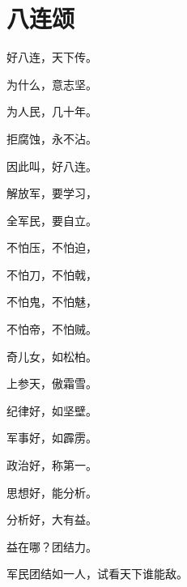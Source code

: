 \section[八连颂（一九六三年八月一日）]{八连颂}



好八连，天下传。

为什么，意志坚。

为人民，几十年。

拒腐蚀，永不沾。

因此叫，好八连。

解放军，要学习，

全军民，要自立。

不怕压，不怕迫，

不怕刀，不怕戟，

不怕鬼，不怕魅，

不怕帝，不怕贼。

奇儿女，如松柏。

上参天，傲霜雪。

纪律好，如坚壁。

军事好，如霹雳。

政治好，称第一。

思想好，能分析。

分析好，大有益。

益在哪？团结力。

军民团结如一人，试看天下谁能敌。



